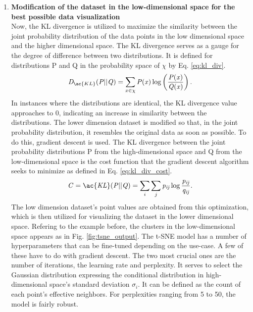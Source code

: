 \begin{enumerate}
    \item \textbf{Modification of the dataset in the low-dimensional space for the best possible data visualization}\\
    Now, the \ac{KL} divergence is utilized to maximize the similarity between the joint probability distribution of the data points in the low dimensional space and the higher dimensional space. The \ac{KL} divergence serves as a gauge for the degree of difference between two distributions. It is defined for distributions P and Q in the probability space of $\chi$ by Eq. \ref{eq:kl_div}.
    \begin{equation}
        \label{eq:kl_div}
        \mathit{D}_{\ac{KL}}(\mathit{P} || \mathit{Q}) = \sum_{x \in \chi} \mathit{P(x)} \log \left( \frac{\mathit{P(x)}}{\mathit{Q(x)}} \right).
    \end{equation}
    In instances where the distributions are identical, the KL divergence value approaches to 0, indicating an increase in similarity between the distributions. The lower dimension dataset is modified so that, in the joint probability distribution, it resembles the original data as soon as possible. To do this, gradient descent is used. The KL divergence between the joint probability distributions P from the high-dimensional space and Q from the low-dimensional space is the cost function that the gradient descent algorithm seeks to minimize as defined in Eq. \ref{eq:kl_div_cost}.
    \begin{equation}
        \label{eq:kl_div_cost}
        \mathit{C} = \mathit{\ac{KL}(P || Q)} = \sum_i \sum_j \mathit{p_{ij}} \log \mathit{\frac{p_{ij}}{q_{ij}}}.
    \end{equation}
    The low dimension dataset's point values are obtained from this optimization, which is then utilized for visualizing the dataset in the lower dimensional space. Refering to the example before, the clusters in the low-dimensional space appears as in Fig. \ref{fig:tsne_output}. The \ac{t-SNE} model has a number of hyperparameters that can be fine-tuned depending on the use-case. A few of these have to do with gradient descent. The two most crucial ones are the number of iterations, the learning rate and perplexity. It serves to select the Gaussian distribution expressing the conditional distribution in high-dimensional space's standard deviation $\sigma_i$. It can be defined as the count of each point's effective neighbors. For perplexities ranging from 5 to 50, the model is fairly robust.\cite{van2008visualizing}

\end{enumerate}


